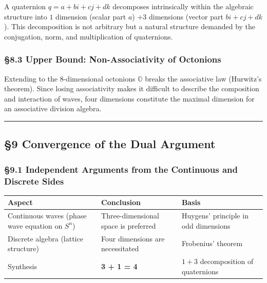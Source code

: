 \documentclass[
  a4paper,11pt]{article}
\newcounter{none}
\theoremstyle{definition}
\theoremstyle{remark}
\begin{document}
A quaternion \(q = a + bi + cj + dk\) decomposes intrinsically within
the algebraic structure into \(1\) dimension (scalar part \(a\)) \(+ 3\)
dimensions (vector part \(bi + cj + dk\)). This decomposition is not
arbitrary but a natural structure demanded by the conjugation, norm, and
multiplication of quaternions.

\subsubsection{§8.3 Upper Bound: Non-Associativity of
Octonions}\label{upper-bound-non-associativity-of-octonions}

Extending to the 8-dimensional octonions \(\mathbb{O}\) breaks the
associative law (Hurwitz's theorem). Since losing associativity makes it
difficult to describe the composition and interaction of waves, four
dimensions constitute the maximal dimension for an associative division
algebra.

\begin{center}\rule{0.5\linewidth}{0.5pt}\end{center}

\subsection{§9 Convergence of the Dual
Argument}\label{convergence-of-the-dual-argument}

\subsubsection{§9.1 Independent Arguments from the Continuous and
Discrete
Sides}\label{independent-arguments-from-the-continuous-and-discrete-sides}

{\def\LTcaptype{none} %
\begin{longtable}[]{@{}
  >{\raggedright\arraybackslash}p{}
  >{\raggedright\arraybackslash}p{}
  >{\raggedright\arraybackslash}p{}@{}}
\toprule\noalign{}
\begin{minipage}[b]{\linewidth}\raggedright
Aspect
\end{minipage} & \begin{minipage}[b]{\linewidth}\raggedright
Conclusion
\end{minipage} & \begin{minipage}[b]{\linewidth}\raggedright
Basis
\end{minipage} \\
\midrule\noalign{}
\endhead
\bottomrule\noalign{}
\endlastfoot
Continuous waves (phase wave equation on \(S^n\)) & Three-dimensional
space is preferred & Huygens' principle in odd dimensions \\
Discrete algebra (lattice structure) & Four dimensions are necessitated
& Frobenius' theorem \\
Synthesis & \textbf{3 + 1 = 4} & \(1+3\) decomposition of quaternions \\
\end{longtable}
}
\end{document}
